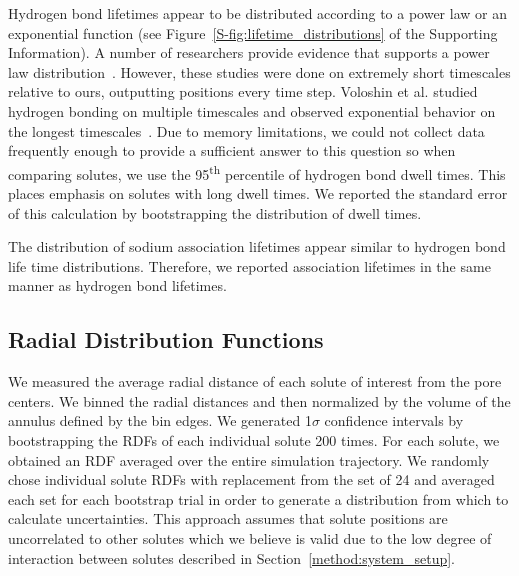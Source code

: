 \documentclass[journal=jpcbfk,manuscript=article]{achemso}
\begin{document}
  Hydrogen bond lifetimes appear to be distributed according to a power law or an
  exponential function (see Figure~\ref{S-fig:lifetime_distributions} of the 
  Supporting Information). A number of researchers provide evidence that supports a 
  power law distribution~\cite{starr_fast_1999,martiniano_insights_2013}. However, these
  studies were done on extremely short timescales relative to ours, outputting positions
  every time step. Voloshin et al. studied hydrogen bonding on multiple timescales and 
  observed exponential behavior on the longest timescales~\cite{voloshin_hydrogen_2009}. 
  Due to memory limitations, we could not collect data frequently enough to provide a
  sufficient answer to this question so when comparing solutes, we use the 95\textsuperscript{th} 
  percentile of hydrogen bond dwell times. This places emphasis on solutes with 
  long dwell times. We reported the standard error of this calculation by bootstrapping
  the distribution of dwell times.
  
  The distribution of sodium association lifetimes appear similar to
  hydrogen bond life time distributions. Therefore, we reported association
  lifetimes in the same manner as hydrogen bond lifetimes.
  
  \subsection{Radial Distribution Functions}\label{method:rdfs}

  We measured the average radial distance of each solute of interest 
  from the pore centers. We binned the radial distances and then 
  normalized by the volume of the annulus defined by the bin edges.
  We generated 1$\sigma$ confidence intervals by bootstrapping the 
  RDFs of each individual solute 200 times. For each solute, we obtained
  an RDF averaged over the entire simulation trajectory. We randomly 
  chose individual solute RDFs with replacement from the set of 24 and averaged 
  each set for each bootstrap trial in order to generate a distribution from 
  which to calculate uncertainties. 
  This approach assumes that solute positions are uncorrelated to
  other solutes which we believe is valid due to the low degree of 
  interaction between solutes described in Section~\ref{method:system_setup}.
  
\end{document}
